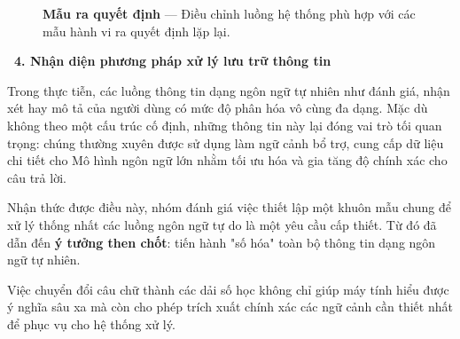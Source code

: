 \documentclass[12pt, a4paper]{article}
\begin{document}
\begin{figure}[H]
    \centering
    \caption{\textbf{Mẫu ra quyết định} --- Điều chỉnh luồng hệ thống phù hợp với các mẫu hành vi ra quyết định lặp lại.}
\end{figure}

\vspace{0.4cm}
\noindent\textcolor{purple!80!black}{\textbf{\faStar \ 4. Nhận diện phương pháp xử lý lưu trữ thông tin}}
\vspace{0.15cm}

\begin{tcolorbox}[blanker, borderline west={3pt}{0pt}{purple!60!black}, left=12pt, top=2pt, bottom=2pt]
Trong thực tiễn, các luồng thông tin dạng ngôn ngữ tự nhiên như đánh giá, nhận xét hay mô tả của người dùng có mức độ phân hóa vô cùng đa dạng. Mặc dù không theo một cấu trúc cố định, những thông tin này lại đóng vai trò tối quan trọng: chúng thường xuyên được sử dụng làm ngữ cảnh bổ trợ, cung cấp dữ liệu chi tiết cho Mô hình ngôn ngữ lớn nhằm tối ưu hóa và gia tăng độ chính xác cho câu trả lời.

\vspace{0.15cm}
\noindent Nhận thức được điều này, nhóm đánh giá việc thiết lập một khuôn mẫu chung để xử lý thống nhất các luồng ngôn ngữ tự do là một yêu cầu cấp thiết. Từ đó đã dẫn đến \textbf{ý tưởng then chốt}: tiến hành "số hóa" toàn bộ thông tin dạng ngôn ngữ tự nhiên.

\vspace{0.15cm}
\noindent Việc chuyển đổi câu chữ thành các dải số học không chỉ giúp máy tính hiểu được ý nghĩa sâu xa mà còn cho phép trích xuất chính xác các ngữ cảnh cần thiết nhất để phục vụ cho hệ thống xử lý.
\end{tcolorbox}
\end{document}
